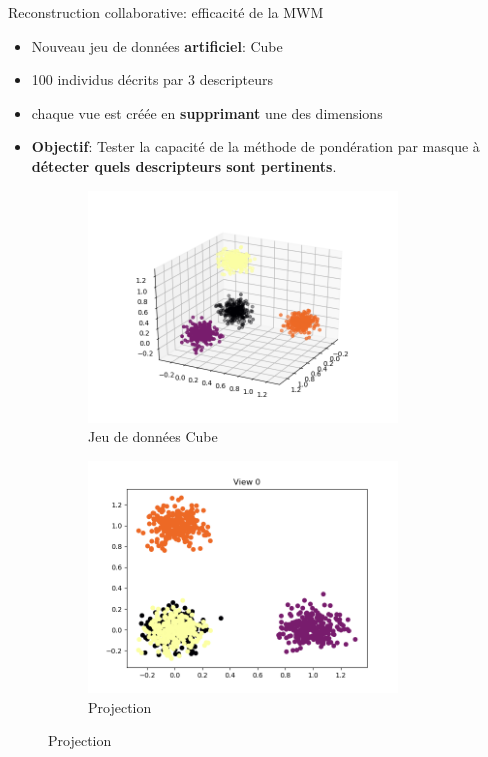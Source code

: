 \documentclass[hyperref={pdfpagelabels=false}]{beamer}
\begin{document}
    \begin{frame}{Reconstruction collaborative: efficacité de la MWM}

        \begin{itemize}
            \item Nouveau jeu de données \textbf{artificiel}: Cube
            \item 100 individus décrits par 
                3 descripteurs
            \item chaque vue est créée en \textbf{supprimant} une des dimensions
            \item \textbf{Objectif}: Tester la capacité de la méthode de 
                pondération par masque à \textbf{détecter quels descripteurs 
                sont pertinents}.
        \end{itemize}
        \begin{figure}[h]
            \centering
            \begin{subfigure}[h]{0.49\textwidth}
                \centering
                \includegraphics[width=0.9\textwidth]{data}
                \caption{Jeu de données Cube}
            \end{subfigure}
            \begin{subfigure}[h]{0.49\textwidth}
                \centering
                \includegraphics[width=0.9\textwidth]{projection0}
                \caption{Projection}
            \end{subfigure}
        \end{figure}
    \end{frame}
\end{document}
